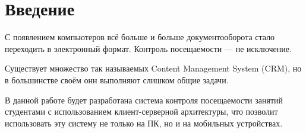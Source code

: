 \section*{Введение}

С появлением компьютеров всё больше и больше документооборота стало переходить в электронный формат.
Контроль посещаемости --- не исключение.

Существует множество так называемых Content Management System (CRM), но в большинстве своём онн выполняют слишком общие задачи.

В данной работе будет разработана система контроля посещаемости занятий студентами с использованием клиент-серверной архитектуры, что позволит использовать эту систему не только на ПК, но и на мобильных устройствах.